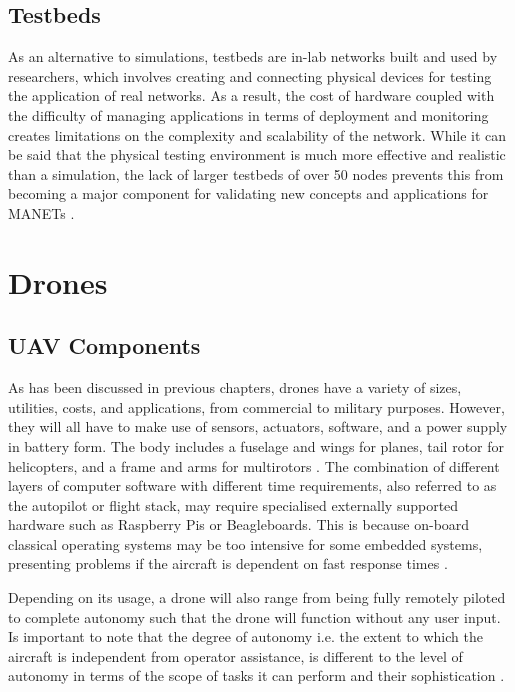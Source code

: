 \subsection{Testbeds}
As an alternative to simulations, testbeds are in-lab networks built and used by researchers, which involves creating and connecting physical devices for testing the application of real networks. As a result, the cost of hardware coupled with the difficulty of managing applications in terms of deployment and monitoring creates limitations on the complexity and scalability of the network. While it can be said that the physical testing environment is much more effective and realistic than a simulation, the lack of larger testbeds of over 50 nodes prevents this from becoming a major component for validating new concepts and applications for MANETs \cite{luchogie2006}.

\section{Drones}

\subsection{UAV Components}
As has been discussed in previous chapters, drones have a variety of sizes, utilities, costs, and applications, from commercial to military purposes. However, they will all have to make use of sensors, actuators, software, and a power supply in battery form. The body includes a fuselage and wings for planes, tail rotor for helicopters, and a frame and arms for multirotors \cite{mitchjohnson2015}. The combination of different layers of computer software with different time requirements, also referred to as the autopilot or flight stack, may require specialised externally supported hardware such as Raspberry Pis or Beagleboards. This is because on-board classical operating systems may be too intensive for some embedded systems, presenting problems if the aircraft is dependent on fast response times \cite{paparazzi2016}. 

Depending on its usage, a drone will also range from being fully remotely piloted to complete autonomy such that the drone will function without any user input. Is important to note that the degree of autonomy i.e. the extent to which the aircraft is independent from operator assistance, is different to the level of autonomy in terms of the scope of tasks it can perform and their sophistication \cite{williammarra2012}.

